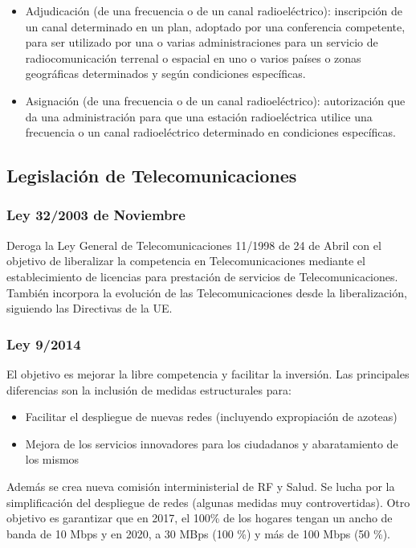 \begin{itemize}
\begin{itemize}
		\item Adjudicación (de una frecuencia o de un canal radioeléctrico): inscripción de un canal determinado en un plan, adoptado por una conferencia competente, para ser utilizado por una o varias administraciones para un servicio de radiocomunicación terrenal o espacial en uno o varios países o zonas geográficas determinados y según condiciones específicas.
		\item Asignación (de una frecuencia o de un canal radioeléctrico): autorización que da una administración para que una estación radioeléctrica utilice una frecuencia o un canal radioeléctrico determinado en condiciones específicas. 
	\end{itemize}
\end{itemize}
\subsection{Legislación de Telecomunicaciones}
\subsubsection{Ley 32/2003 de Noviembre}
Deroga la Ley General de Telecomunicaciones 11/1998 de 24 de Abril con el objetivo de liberalizar la competencia en Telecomunicaciones mediante el establecimiento de licencias para prestación de servicios de Telecomunicaciones. También incorpora la evolución de las Telecomunicaciones desde la liberalización, siguiendo las Directivas de la UE.
\subsubsection{Ley 9/2014}
El objetivo es mejorar la libre competencia y facilitar la inversión. Las principales diferencias son la inclusión de medidas estructurales para:
\begin{itemize}
	\item Facilitar el despliegue de nuevas redes (incluyendo expropiación de azoteas)
	\item Mejora de los servicios innovadores para los ciudadanos y abaratamiento de los mismos
\end{itemize}
Además se crea nueva comisión interministerial de RF y Salud. Se lucha por la simplificación del despliegue de redes (algunas medidas muy controvertidas). Otro objetivo es garantizar que en 2017, el 100\% de los hogares tengan un ancho de banda de 10 Mbps y en 2020, a 30 MBps (100 \%) y más de 100 Mbps (50 \%).